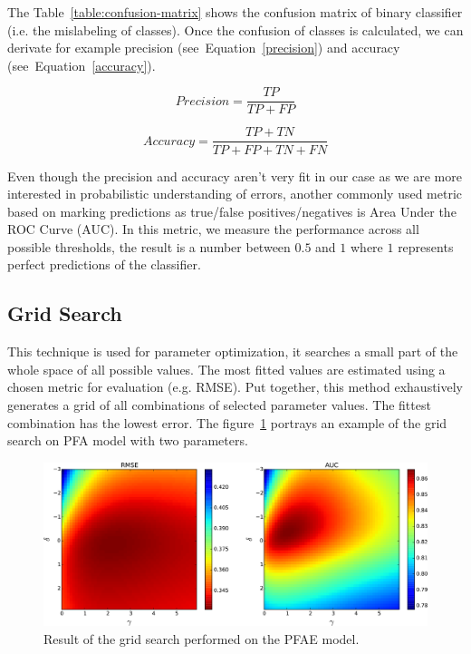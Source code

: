 The Table~\ref{table:confusion-matrix} shows the confusion matrix of binary classifier (i.e. the mislabeling of classes). Once the confusion of classes is calculated, we can derivate for example precision (see~Equation~\ref{precision}) and accuracy (see~Equation~\ref{accuracy}).

\begin{equation} \label{precision}
  \mathit{Precision} = \frac{TP}{TP + FP}
\end{equation}

\begin{equation} \label{accuracy}
  \mathit{Accuracy} = \frac{TP + TN}{TP + FP + TN + FN}
\end{equation}

Even though the precision and accuracy aren't very fit in our case as we are more interested in probabilistic understanding of errors, another commonly used metric based on marking predictions as true/false positives/negatives is Area Under the ROC Curve (AUC). In this metric, we measure the performance across all possible thresholds, the result is a number between $0.5$ and $1$ where $1$ represents perfect predictions of the classifier.

\subsection{Grid Search}

This technique is used for parameter optimization, it searches a small part of the whole space of all possible values. The most fitted values are estimated using a chosen metric for evaluation (e.g. RMSE). Put together, this method exhaustively generates a grid of all combinations of selected parameter values. The fittest combination has the lowest error. The figure~\ref{fig-grid-search-rmse-auc} portrays an example of the grid search on PFA model with two parameters.

\begin{figure}[htbp]
  \centering
  \includegraphics[width=\textwidth]{img/pfa-grid-search-rmse-auc}
  \caption{Result of the grid search performed on the PFAE model.}
  \label{fig-grid-search-rmse-auc}
\end{figure}

